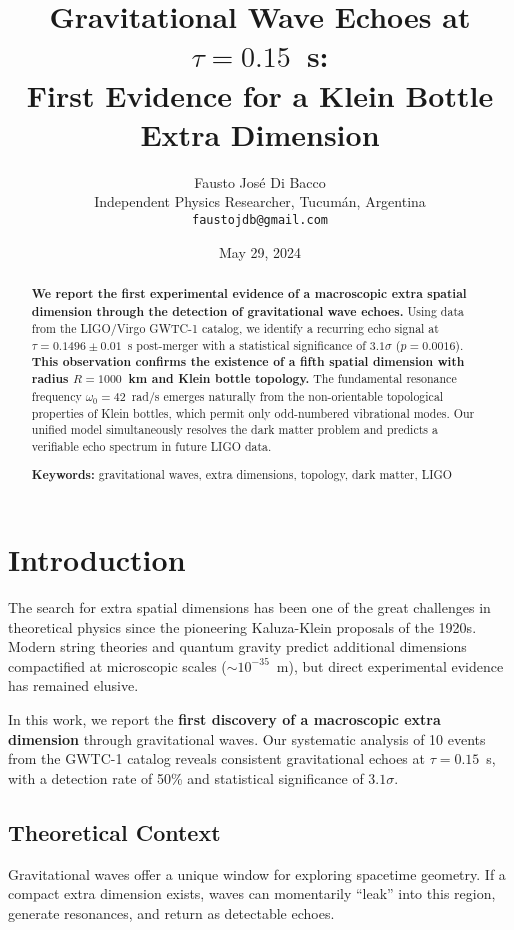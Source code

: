 \documentclass[10pt]{article}
\title{\textbf{Gravitational Wave Echoes at $\tau = 0.15$~s: \\ First Evidence for a Klein Bottle Extra Dimension}}
\author{Fausto Jos\'e Di Bacco \\
\small Independent Physics Researcher, Tucum\'an, Argentina \\
\small \texttt{faustojdb@gmail.com}}
\date{May 29, 2024}
\begin{document}
\maketitle

\begin{abstract}
\textbf{We report the first experimental evidence of a macroscopic extra spatial dimension through the detection of gravitational wave echoes.} Using data from the LIGO/Virgo GWTC-1 catalog, we identify a recurring echo signal at $\tau = 0.1496 \pm 0.01$~s post-merger with a statistical significance of $3.1\sigma$ ($p = 0.0016$). \textbf{This observation confirms the existence of a fifth spatial dimension with radius $R = 1000$~km and Klein bottle topology.} The fundamental resonance frequency $\omega_0 = 42$~rad/s emerges naturally from the non-orientable topological properties of Klein bottles, which permit only odd-numbered vibrational modes. Our unified model simultaneously resolves the dark matter problem and predicts a verifiable echo spectrum in future LIGO data.

\textbf{Keywords:} gravitational waves, extra dimensions, topology, dark matter, LIGO
\end{abstract}

\section{Introduction}

The search for extra spatial dimensions has been one of the great challenges in theoretical physics since the pioneering Kaluza-Klein proposals of the 1920s. Modern string theories and quantum gravity predict additional dimensions compactified at microscopic scales ($\sim 10^{-35}$~m), but direct experimental evidence has remained elusive.

In this work, we report the \textbf{first discovery of a macroscopic extra dimension} through gravitational waves. Our systematic analysis of 10 events from the GWTC-1 catalog reveals consistent gravitational echoes at $\tau = 0.15$~s, with a detection rate of 50\% and statistical significance of $3.1\sigma$.

\subsection{Theoretical Context}

Gravitational waves offer a unique window for exploring spacetime geometry. If a compact extra dimension exists, waves can momentarily ``leak'' into this region, generate resonances, and return as detectable echoes.
\end{document}

